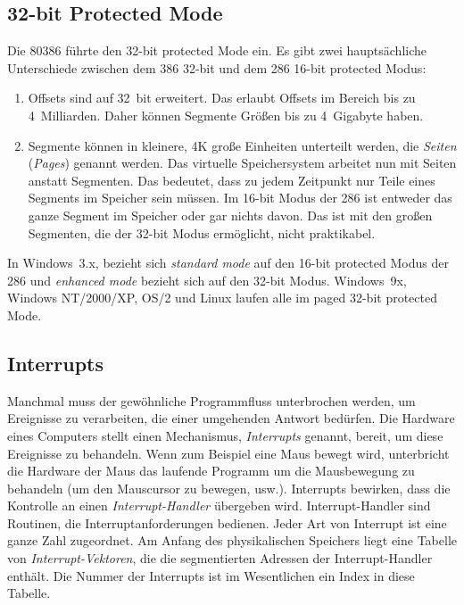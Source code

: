 \subsection{32-bit Protected Mode}

Die 80386 f\"{u}hrte den 32-bit protected Mode ein. Es gibt zwei
haupts\"{a}chliche Unterschiede zwischen dem 386 32-bit und dem 286
16-bit protected Modus:
\begin{enumerate}
\parskip=-0.10em %

\item
Offsets sind auf 32~bit erweitert. Das erlaubt Offsets im Bereich
bis zu 4~Milliarden. Daher k\"{o}nnen Segmente Gr\"{o}{\ss}en bis zu 4~Gigabyte
haben.

\item
Segmente  k\"{o}nnen in kleinere, 4K gro{\ss}e
Einheiten unterteilt werden, die \emph{Seiten} (\emph{Pages})
  genannt werden. Das
virtuelle Speichersystem  arbeitet nun
mit Seiten anstatt Segmenten. Das bedeutet, dass zu jedem Zeitpunkt
nur Teile eines Segments im Speicher sein m\"{u}ssen. Im 16-bit Modus
der 286 ist entweder das ganze Segment im Speicher oder gar nichts
davon. Das ist mit den gro{\ss}en Segmenten, die der 32-bit Modus
erm\"{o}glicht, nicht praktikabel.

\end{enumerate}


In Windows~3.x, bezieht sich \emph{standard mode} auf den 16-bit
protected Modus der 286 und \emph{enhanced mode} bezieht sich auf
den 32-bit Modus. Windows~9x, Windows NT/2000/XP, OS/2 und Linux
laufen alle im paged 32-bit protected Mode.

\subsection{Interrupts}

Manchmal muss der gew\"{o}hnliche Programmfluss unterbrochen werden, um
Ereignisse zu verarbeiten, die einer umgehenden Antwort bed\"{u}rfen.
Die Hardware eines Computers stellt einen Mechanismus,
\emph{Interrupts} genannt, bereit, um diese Ereignisse zu behandeln.
Wenn zum Beispiel eine Maus bewegt wird, unterbricht die Hardware
der Maus das laufende Programm um die Mausbewegung zu behandeln (um
den Mauscursor zu bewegen, usw.). Interrupts bewirken, dass die
Kontrolle an einen \emph{Interrupt-Handler} \"{u}bergeben wird.
Interrupt-Handler sind Routinen, die Interruptanforderungen
bedienen. Jeder Art von Interrupt ist eine ganze Zahl zugeordnet. Am
Anfang des physikalischen Speichers liegt eine Tabelle von
\emph{Interrupt-Vektoren}, die die segmentierten Adressen der
Interrupt-Handler enth\"{a}lt. Die Nummer der Interrupts ist im
Wesentlichen ein Index in diese Tabelle.

